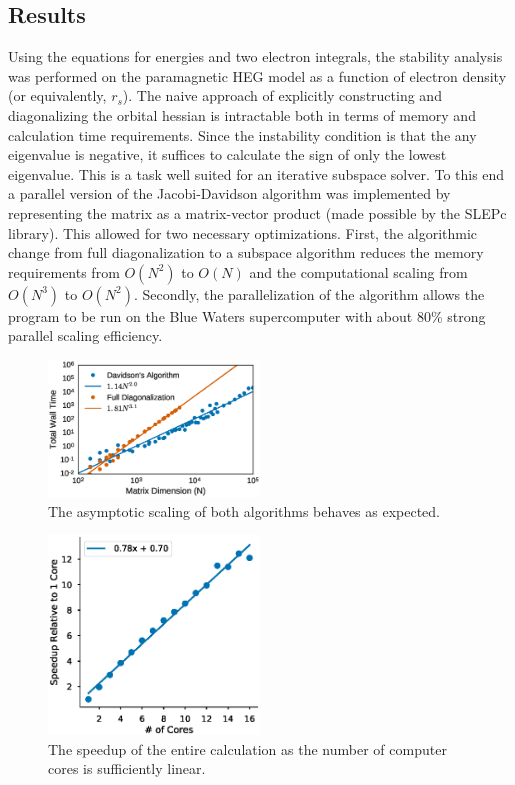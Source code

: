 \documentclass{revtex4}
\begin{document}
 \subsection{Results}   
      Using the equations for energies and two electron integrals, the stability analysis was 
      performed on the paramagnetic HEG model as a function of electron density (or equivalently, 
      $r_s$). The naive approach of explicitly constructing and diagonalizing the orbital hessian 
      is intractable both in terms of memory and calculation time requirements. Since the 
      instability condition is that the any eigenvalue is negative, it suffices to calculate the 
      sign of only the lowest eigenvalue. This is a task well suited for an iterative subspace 
      solver. To this end a parallel version of the Jacobi-Davidson algorithm 
      was implemented by representing the matrix as a matrix-vector product (made possible by the 
      SLEPc library\cite{Hernandez2005}). This allowed for two necessary optimizations. First, the 
      algorithmic change from full diagonalization to a subspace algorithm reduces the memory 
      requirements from $O(N^2)$ to $O(N)$ and the computational scaling from $O(N^3)$ to $O(N^2)$. 
      Secondly, the parallelization of the algorithm allows the program to be run on the Blue 
      Waters supercomputer with about 80\% strong parallel scaling efficiency. 
     \begin{figure}[H]
       \centering
       \includegraphics[width=0.5\textwidth]{../figures/dav_vs_exact_scaling.eps}
       \caption{The asymptotic scaling of both algorithms behaves as expected.}
     \end{figure}  
     \begin{figure}[H]
     \centering
      \includegraphics[width=0.5\textwidth]{../figures/parallel-scaling.eps}
      \caption{The speedup of the entire calculation as the number of computer cores is 
      sufficiently linear.}
     \end{figure}     
\end{document}
